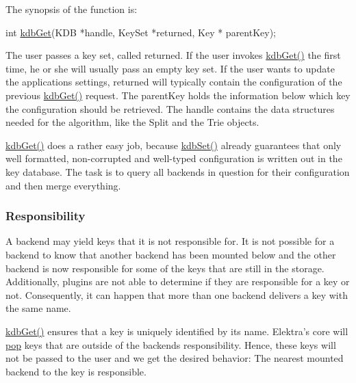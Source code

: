 The synopsis of the function is\+:


\begin{DoxyCode}
\textcolor{keywordtype}{int} \hyperlink{group__kdb_ga28e385fd9cb7ccfe0b2f1ed2f62453a1}{kdbGet}(KDB *handle, KeySet *returned, Key * parentKey);
\end{DoxyCode}


The user passes a key set, called {\ttfamily returned}. If the user invokes {\ttfamily \hyperlink{group__kdb_ga28e385fd9cb7ccfe0b2f1ed2f62453a1}{kdb\+Get()}} the first time, he or she will usually pass an empty key set. If the user wants to update the application\textquotesingle{}s settings, {\ttfamily returned} will typically contain the configuration of the previous {\ttfamily \hyperlink{group__kdb_ga28e385fd9cb7ccfe0b2f1ed2f62453a1}{kdb\+Get()}} request. The {\ttfamily parent\+Key} holds the information below which key the configuration should be retrieved. The {\ttfamily handle} contains the data structures needed for the algorithm, like the {\ttfamily Split} and the {\ttfamily Trie} objects.

{\ttfamily \hyperlink{group__kdb_ga28e385fd9cb7ccfe0b2f1ed2f62453a1}{kdb\+Get()}} does a rather easy job, because {\ttfamily \hyperlink{group__kdb_ga11436b058408f83d303ca5e996832bcf}{kdb\+Set()}} already guarantees that only well formatted, non-\/corrupted and well-\/typed configuration is written out in the key database. The task is to query all backends in question for their configuration and then merge everything.

\subsubsection*{Responsibility}

A backend may yield keys that it is not responsible for. It is not possible for a backend to know that another backend has been mounted below and the other backend is now responsible for some of the keys that are still in the storage. Additionally, plugins are not able to determine if they are responsible for a key or not. Consequently, it can happen that more than one backend delivers a key with the same name.

{\ttfamily \hyperlink{group__kdb_ga28e385fd9cb7ccfe0b2f1ed2f62453a1}{kdb\+Get()}} ensures that a key is uniquely identified by its name. Elektra’s core will \hyperlink{doc_help_elektra-glossary_md}{pop} keys that are outside of the backend\textquotesingle{}s responsibility. Hence, these keys will not be passed to the user and we get the desired behavior\+: The nearest mounted backend to the key is responsible.


